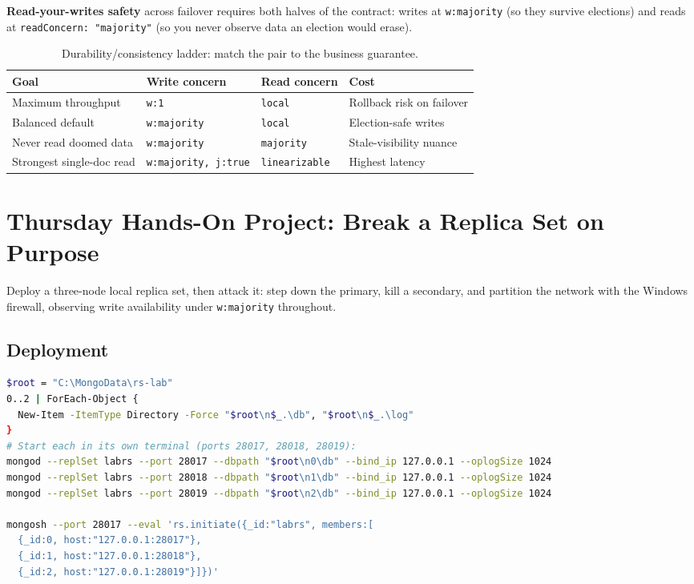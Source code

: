 \begin{definitionbox}
\textbf{Read-your-writes safety} across failover requires both halves of the contract: writes at \texttt{w:majority} (so they survive elections) and reads at \texttt{readConcern: "majority"} (so you never observe data an election would erase).
\end{definitionbox}

\begin{table}[H]
\centering\footnotesize
\begin{tabular}{@{}llll@{}}
\toprule
\textbf{Goal} & \textbf{Write concern} & \textbf{Read concern} & \textbf{Cost} \\
\midrule
Maximum throughput & \texttt{w:1} & \texttt{local} & Rollback risk on failover \\
Balanced default & \texttt{w:majority} & \texttt{local} & Election-safe writes \\
Never read doomed data & \texttt{w:majority} & \texttt{majority} & Stale-visibility nuance \\
Strongest single-doc read & \texttt{w:majority, j:true} & \texttt{linearizable} & Highest latency \\
\bottomrule
\end{tabular}
\caption{Durability/consistency ladder: match the pair to the business guarantee.}
\label{tab:ch9-ladder}
\end{table}

\section{Thursday Hands-On Project: Break a Replica Set on Purpose}
Deploy a three-node local replica set, then attack it: step down the primary, kill a secondary, and partition the network with the Windows firewall, observing write availability under \texttt{w:majority} throughout.

\subsection{Deployment}
\begin{lstlisting}[language=bash, caption={Three local mongod instances forming one replica set.}]
$root = "C:\MongoData\rs-lab"
0..2 | ForEach-Object {
  New-Item -ItemType Directory -Force "$root\n$_.\db", "$root\n$_.\log"
}
# Start each in its own terminal (ports 28017, 28018, 28019):
mongod --replSet labrs --port 28017 --dbpath "$root\n0\db" --bind_ip 127.0.0.1 --oplogSize 1024
mongod --replSet labrs --port 28018 --dbpath "$root\n1\db" --bind_ip 127.0.0.1 --oplogSize 1024
mongod --replSet labrs --port 28019 --dbpath "$root\n2\db" --bind_ip 127.0.0.1 --oplogSize 1024

mongosh --port 28017 --eval 'rs.initiate({_id:"labrs", members:[
  {_id:0, host:"127.0.0.1:28017"},
  {_id:1, host:"127.0.0.1:28018"},
  {_id:2, host:"127.0.0.1:28019"}]})'
\end{lstlisting}

